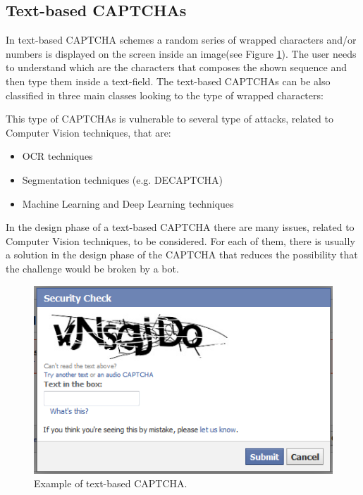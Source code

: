 \subsection{Text-based CAPTCHAs}
In text-based CAPTCHA schemes a random series of wrapped characters and/or numbers is displayed on the screen inside an image(see Figure \ref{soa:text_CAPTCHA}). The user needs to understand which are the characters that composes the shown sequence and then type them inside a text-field. The text-based CAPTCHAs can be also classified in three main classes looking to the type of wrapped characters:
\begin{itemize}
\end{itemize}
This type of CAPTCHAs is vulnerable to several type of attacks, related to Computer Vision techniques, that are:
\begin{itemize}
\item{OCR techniques\cite{OCR}}
\item{Segmentation techniques (e.g. DECAPTCHA\cite{DECAPTCHA})}
\item{Machine Learning and Deep Learning techniques}
\end{itemize}
In the design phase of a text-based CAPTCHA there are many issues, related to Computer Vision techniques, to be considered. For each of them, there is usually a solution in the design phase of the CAPTCHA that reduces the possibility that the challenge would be broken by a bot\cite{DECAPTCHA}.
\begin{figure}[h]
     \centering
     \includegraphics[width=.55\linewidth]{Images/StateOfArt/text_CAPTCHA}
     \caption{\footnotesize{Example of text-based CAPTCHA.}}\label{soa:text_CAPTCHA}
\end{figure}

